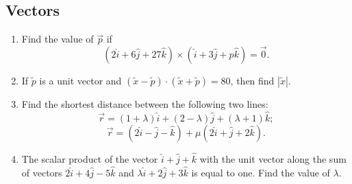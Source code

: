 \documentclass{article}
\begin{document}
\subsection*{Vectors}
\begin{enumerate}
\item 
Find the value of $\vec{p}$ if 
$$(2\hat{i} + 6\hat{j} + 27\hat{k}) \times (\hat{i} + 3\hat{j} + p\hat{k}) = \vec{0}.$$

\item 
If ${\tilde{p}}$ is a unit vector and $({\tilde{x}} - {\tilde{p}}) \cdot ({\tilde{x}} + {\tilde{p}}) = 80$, then find $|{\tilde{x}}|$.

\item 
Find the shortest distance between the following two lines:
$$\vec{r} = (1 + \lambda)\hat{i} + (2 - \lambda)\hat{j} + (\lambda + 1)\hat{k};$$
$$\vec{r} = (2\hat{i} - \hat{j} - \hat{k}) + \mu(2\hat{i} + \hat{j} + 2\hat{k}).$$

\item 
The scalar product of the vector $\hat{i} + \hat{j} + \hat{k}$ with the unit vector along the sum of vectors $2\hat{i} + 4\hat{j} - 5\hat{k}$ and $\lambda \hat{i} + 2\hat{j} + 3\hat{k}$ is equal to one. Find the value of $\lambda$.
\end{enumerate}
\end{document}
